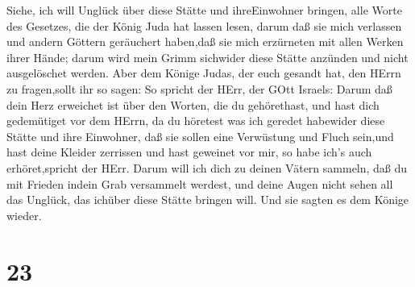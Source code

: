 Siehe, ich will Unglück über diese Stätte und ihreEinwohner bringen,
alle Worte des Gesetzes, die der König Juda hat lassen lesen,
 darum daß sie mich verlassen und andern Göttern geräuchert
haben,daß sie mich erzürneten mit allen Werken ihrer Hände; darum wird
mein Grimm sichwider diese Stätte anzünden und nicht ausgelöschet
werden.  Aber dem Könige Judas, der euch gesandt hat, den
HErrn zu fragen,sollt ihr so sagen: So spricht der HErr, der GOtt
Israels:  Darum daß dein Herz erweichet ist über den
Worten, die du gehörethast, und hast dich gedemütiget vor dem HErrn, da
du höretest was ich geredet habewider diese Stätte und ihre Einwohner,
daß sie sollen eine Verwüstung und Fluch sein,und hast deine Kleider
zerrissen und hast geweinet vor mir, so habe ich's auch erhöret,spricht
der HErr.  Darum will ich dich zu deinen Vätern sammeln,
daß du mit Frieden indein Grab versammelt werdest, und deine Augen nicht
sehen all das Unglück, das ichüber diese Stätte bringen will. Und sie
sagten es dem Könige wieder.

\hypertarget{section-22}{%
\section{23}\label{section-22}}

